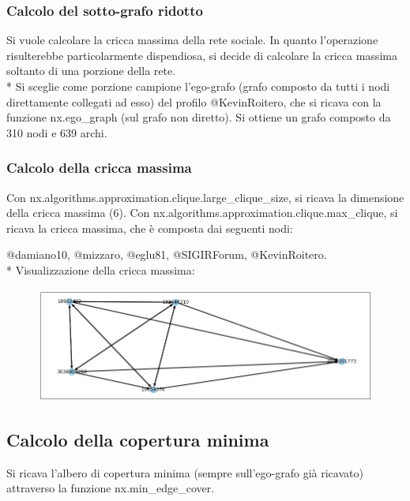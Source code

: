 \documentclass[a4paper, 12pt, twoside]{article}
\begin{document}
\subsubsection{Calcolo del sotto-grafo ridotto}
Si vuole calcolare la cricca massima della rete sociale. In quanto l’operazione risulterebbe particolarmente dispendiosa, si decide di calcolare la cricca massima soltanto di una porzione della rete. \\*
Si sceglie come porzione campione l’ego-grafo (grafo composto da tutti i nodi direttamente collegati ad esso) del profilo @KevinRoitero, che si ricava con la funzione nx.ego\_graph (sul grafo non diretto). Si ottiene un grafo composto da 310 nodi e 639 archi.

\subsubsection{Calcolo della cricca massima}%
Con nx.algorithms.approximation.clique.large\_clique\_size, si ricava la dimensione della  cricca massima (6). Con nx.algorithms.approximation.clique.max\_clique, si ricava la cricca massima, che è composta dai seguenti nodi: 

@damiano10, @mizzaro, @eglu81, @SIGIRForum, @KevinRoitero. \\*
Visualizzazione della cricca massima:

\begin{figure}[h]
    \centering
    \includegraphics[scale=0.4]{images/max clique.png} %
    \label{fig:cricca_max}
\end{figure}


\subsection{Calcolo della copertura minima}
Si ricava l’albero di copertura minima (sempre sull’ego-grafo già ricavato) attraverso la funzione nx.min\_edge\_cover. 
\end{document}
